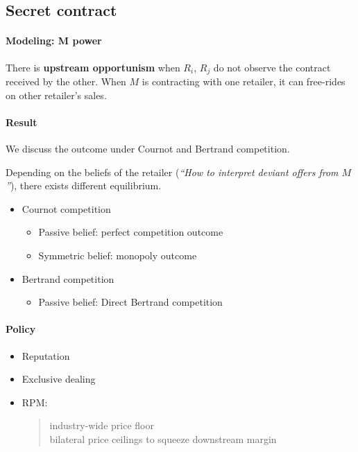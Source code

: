 \subsection*{Secret contract}
\paragraph{Modeling: M power} 
There is \textbf{upstream opportunism} when $R_i$, $R_j$ do not observe the contract received by the other. When $M$ is contracting with one retailer, it can free-rides on other retailer’s sales.
\paragraph{Result} We discuss the outcome under Cournot and Bertrand competition.
\begin{remark}
    Depending on the beliefs of the retailer (\textit{``How to interpret deviant offers from $M$''}), there exists different equilibrium.
\end{remark}
\begin{itemize}
    \item Cournot competition
    \begin{itemize}
        \item Passive belief: perfect competition outcome
        \item Symmetric belief: monopoly outcome
    \end{itemize}
    \item Bertrand competition
    \begin{itemize}
        \item Passive belief: Direct Bertrand competition
    \end{itemize}
\end{itemize}
\paragraph{Policy}
\begin{itemize}
    \item Reputation
    \item Exclusive dealing
    \item RPM: 
        \begin{quote}
            industry-wide price floor\\
            bilateral price ceilings to squeeze downstream margin
        \end{quote}
\end{itemize}

